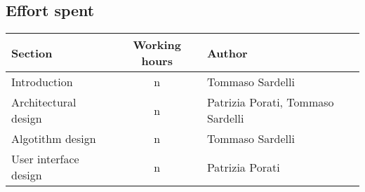 \pagebreak

\subsection{Effort spent}

\begin{center}
	\vspace{0.2cm}
	\begin{tabular}{ l c l } 
		\hline
		Section 					& Working hours 	& Author \\ 
		\hline
		Introduction				& n 				& Tommaso Sardelli	\\
		Architectural design		& n 				& Patrizia Porati, Tommaso Sardelli	\\
		Algotithm design	 		& n				 	& Tommaso Sardelli \\ 
		User interface design		& n	 				& Patrizia Porati	\\

		\hline
	\end{tabular}
\end{center}
